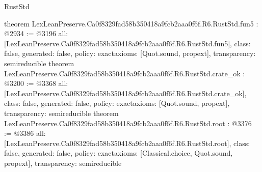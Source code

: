 \begin{lexlean}{RustStd}
\begin{coremodule}
{}
theorem LexLeanPreserve.Ca0f8329fad58b350418a9fcb2aaa0f6f.R6.RustStd.fun5 : @2934 := @3196 {
  all: [LexLeanPreserve.Ca0f8329fad58b350418a9fcb2aaa0f6f.R6.RustStd.fun5],
  class: false,
  generated: false,
  policy: exact{axioms: [Quot.sound, propext]},
  transparency: semireducible
}
theorem LexLeanPreserve.Ca0f8329fad58b350418a9fcb2aaa0f6f.R6.RustStd.crate_ok : @3200 := @3368 {
  all: [LexLeanPreserve.Ca0f8329fad58b350418a9fcb2aaa0f6f.R6.RustStd.crate_ok],
  class: false,
  generated: false,
  policy: exact{axioms: [Quot.sound, propext]},
  transparency: semireducible
}
theorem LexLeanPreserve.Ca0f8329fad58b350418a9fcb2aaa0f6f.R6.RustStd.root : @3376 := @3386 {
  all: [LexLeanPreserve.Ca0f8329fad58b350418a9fcb2aaa0f6f.R6.RustStd.root],
  class: false,
  generated: false,
  policy: exact{axioms: [Classical.choice, Quot.sound, propext]},
  transparency: semireducible
}


\end{coremodule}
\end{lexlean}
